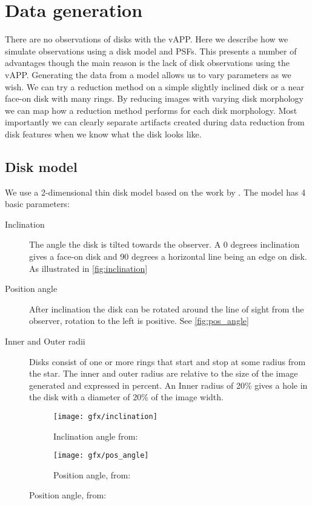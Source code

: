 
\chapter{Data generation} %
\label{ch:data_gen} %

There are no observations of disks with the \ac{vAPP}. Here we describe how we simulate observations using a disk model and \acp{PSF}. This presents a number of advantages though the main reason is the lack of disk observations using the \ac{vAPP}. Generating the data from a model allows us to vary parameters as we wish. We can try a reduction method on a simple slightly inclined disk or a near face-on disk with many rings. By reducing images with varying disk morphology we can map how a reduction method performs for each disk morphology. Most importantly we can clearly separate artifacts created during data reduction from disk features when we know what the disk looks like.




\section{Disk model}
We use a 2-dimensional thin disk model based on the work by \cite{Pieter_Okko}. The model has 4 basic parameters: 

\begin{description}
\item[Inclination] The angle the disk is tilted towards the observer. A 0 degrees inclination gives a face-on disk and 90 degrees a horizontal line being an edge on disk. As illustrated in \autoref{fig:inclination}
\item[Position angle] After inclination the disk can be rotated around the line of sight from the observer, rotation to the left is positive. See \autoref{fig:pos_angle}
\item[Inner and Outer radii] Disks consist of one or more rings that start and stop at some radius from the star. The inner and outer radius are relative to the size of the image generated and expressed in percent. An Inner radius of 20\% gives a hole in the disk with a diameter of 20\% of the image width. %
\end{description}

\begin{figure}[h!]
  \centering
  \begin{subfigure}[b]{0.4\textwidth}
    \texttt{[image: gfx/inclination]}
    \caption{Inclination angle from: \cite{Pieter_Okko}}
    \label{fig:pos_angle}

  \end{subfigure}
  \begin{subfigure}[b]{0.4\textwidth}
    \texttt{[image: gfx/pos\_angle]}
    \caption{Position angle, from: \cite{Pieter_Okko}}
    \label{fig:inclination}
  \end{subfigure}
  \label{fig:1}
\end{figure}

